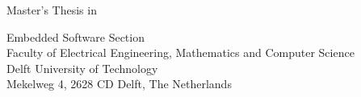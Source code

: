\begin{titlepage}

  \begin{center}
  \null\vfill
    \begin{center}
    \LARGE{\reportTitle}
    \end{center}

    \vspace{3cm}

    \begin{large}
    Master's Thesis in \reportMSC
    \end{large}

    \vspace{1.5cm}

    \begin{normalsize}
    Embedded Software Section\\
    Faculty of Electrical Engineering, Mathematics and Computer Science\\
    Delft University of Technology\\
    Mekelweg 4, 2628 CD Delft, The Netherlands
    \end{normalsize}

    \vspace{2.0cm}

    \begin{normalsize}
    \reportAuthor \\
    \reportUrlEmail
    \end{normalsize}

    \vspace{1.0cm}

    \reportDate             %

  \vfill
  \end{center}

\end{titlepage}
